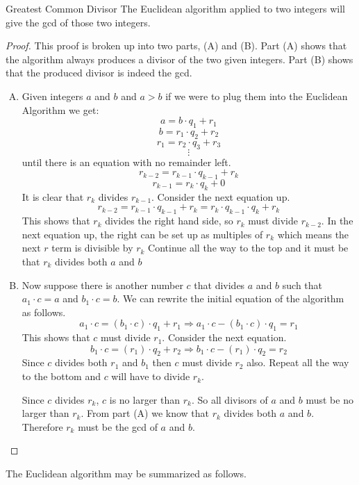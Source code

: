 \begin{prop}{Greatest Common Divisor}
The Euclidean algorithm applied to two integers will give the gcd of those two integers.
\end{prop}
\begin{proof}
This proof is broken up into two parts, (A) and (B).  Part (A) shows that the algorithm always produces a divisor of the two given integers.  Part (B) shows that the produced divisor is indeed the gcd.

\begin {enumerate}[(A)]
\item
Given integers $a$ and $b$ and $a>b$ if we were to plug them into the Euclidean Algorithm we get:
\[a = b\cdot q_1 + r_1\]
\[b = r_1\cdot q_2 + r_2\]
\[r_1 = r_2\cdot q_3 + r_3\]
\[\vdots\]
until there is an equation with no remainder left.
\[r_{k-2} = r_{k-1}\cdot q_{k-1} + r_k\]
\[r_{k-1} = r_k\cdot q_k + 0\]
It is clear that $r_k$ divides $r_{k-1}$. Consider the next equation up.  
\[r_{k-2} = r_{k-1}\cdot q_{k-1} + r_k = r_{k}\cdot q_{k-1} \cdot q_{k} + r_k\]
This shows that $r_{k} $ divides the right hand side, so $r_{k}$ must divide $r_{k-2}$.
In the next equation up, the right can be set up as multiples of $r_{k}$ which means the next $r$ term is divisible by $r_k$
Continue all the way to the top and it must be that $r_k$ divides both $a$ and $b$
\item
Now suppose there is another number $c$ that divides $a$ and $b$ such that $a_1 \cdot c = a$ and $b_1 \cdot c = b$.  We can rewrite the initial equation of the algorithm as follows.
\[a_1\cdot c = (b_1 \cdot c)\cdot q_1 + r_1 \Rightarrow a_1\cdot c - (b_1 \cdot c)\cdot q_1 = r_1\]
This shows that $c$ must divide $r_1$.  Consider the next equation.
\[b_1\cdot c = (r_1)\cdot q_2 + r_2 \Rightarrow b_1\cdot c - (r_1)\cdot q_2 = r_2\]
Since $c$ divides both $r_1$ and $b_1$ then $c$ must divide $r_2$ also.
Repeat all the way to the bottom and $c$ will have to divide $r_k$.

Since $c$ divides $r_k$, $c$ is no larger than $r_k$.  So all divisors of $a$ and $b$ must be no larger than $r_k$.  From part (A) we know that $r_k$ divides both $a$ and $b$. Therefore $r_k$ must be the gcd of $a$ and $b$.
\end {enumerate}
\end {proof}

The Euclidean algorithm may be summarized as follows.

